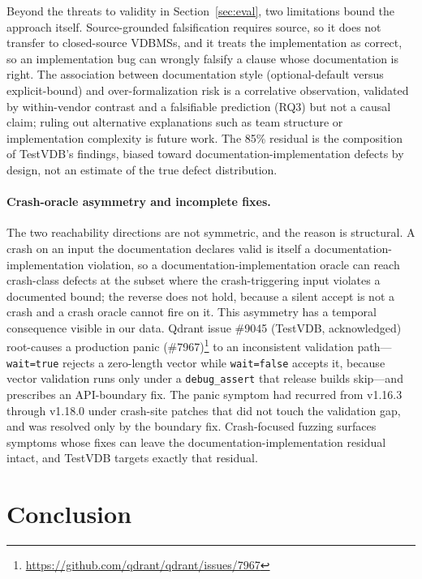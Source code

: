 \documentclass[sigconf]{acmart}
\begin{document}
Beyond the threats to validity in Section~\ref{sec:eval}, two limitations bound the approach itself. Source-grounded falsification requires source, so it does not transfer to closed-source VDBMSs, and it treats the implementation as correct, so an implementation bug can wrongly falsify a clause whose documentation is right. The association between documentation style (optional-default versus explicit-bound) and over-formalization risk is a correlative observation, validated by within-vendor contrast and a falsifiable prediction (RQ3) but not a causal claim; ruling out alternative explanations such as team structure or implementation complexity is future work. The 85\% residual is the composition of TestVDB's findings, biased toward documentation-implementation defects by design, not an estimate of the true defect distribution.

\paragraph{Crash-oracle asymmetry and incomplete fixes.} The two reachability directions are not symmetric, and the reason is structural. A crash on an input the documentation declares valid is itself a documentation-implementation violation, so a documentation-implementation oracle can reach crash-class defects at the subset where the crash-triggering input violates a documented bound; the reverse does not hold, because a silent accept is not a crash and a crash oracle cannot fire on it. This asymmetry has a temporal consequence visible in our data. Qdrant issue \#9045 (TestVDB, acknowledged) root-causes a production panic (\#7967)\footnote{\url{https://github.com/qdrant/qdrant/issues/7967}} to an inconsistent validation path---\texttt{wait=true} rejects a zero-length vector while \texttt{wait=false} accepts it, because vector validation runs only under a \texttt{debug\_assert} that release builds skip---and prescribes an API-boundary fix. The panic symptom had recurred from v1.16.3 through v1.18.0 under crash-site patches that did not touch the validation gap, and was resolved only by the boundary fix. Crash-focused fuzzing surfaces symptoms whose fixes can leave the documentation-implementation residual intact, and TestVDB targets exactly that residual.

\section{Conclusion}
\end{document}
